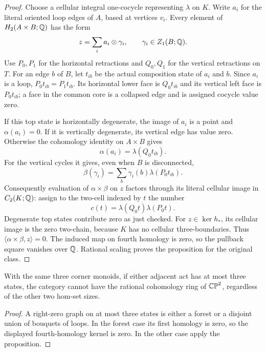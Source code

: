 \begin{proof}
Choose a cellular integral one-cocycle representing
$\lambda$ on $K$.  Write $a_i$ for the literal oriented
loop edges of $A$, based at vertices $v_i$.  Every element
of $H_2(A\times B;\mathbb Q)$ has the form
\[
 z=\sum_i a_i\otimes\gamma_i,
 \qquad \gamma_i\in Z_1(B;\mathbb Q).
\]
Use $P_0,P_1$ for the horizontal retractions and $Q_0,Q_1$
for the vertical retractions on $T$.  For an edge $b$ of
$B$, let $t_{ib}$ be the actual composition state of
$a_i$ and $b$.  Since $a_i$ is a loop,
$P_0t_{ib}=P_1t_{ib}$.  Its horizontal lower face is
$Q_0t_{ib}$ and its vertical left face is $P_0t_{ib}$;
a face in the common core is a collapsed edge and is
assigned cocycle value zero.

If this top state is horizontally degenerate, the image
of $a_i$ is a point and $\alpha(a_i)=0$.  If it is
vertically degenerate, its vertical edge has value zero.
Otherwise the cohomology identity on $A\times B$ gives
\[
 \alpha(a_i)=\lambda(Q_0t_{ib}).
\]
For the vertical cycles it gives, even when $B$ is
disconnected,
\[
 \beta(\gamma_i)
   =\sum_b\gamma_i(b)\lambda(P_0t_{ib}).
\]
Consequently evaluation of $\alpha\times\beta$ on $z$
factors through its literal cellular image in $C_2(K;\mathbb Q)$:
assign to the two-cell indexed by $t$ the number
\[
 c(t)=\lambda(Q_0t)\lambda(P_0t).
\]
Degenerate top states contribute zero as just checked.
For $z\in\ker h_*$, its cellular image is the zero
two-chain, because $K$ has no cellular three-boundaries.
Thus $\langle\alpha\times\beta,z\rangle=0$.
The induced map on fourth homology is zero, so the
pullback square vanishes over $\mathbb Q$.  Rational scaling
proves the proposition for the original class.
\end{proof}

\begin{corollary}\label{C:three-state-adjacent-chart-square}
With the same three corner monoids, if either adjacent
act has at most three states, the category cannot have
the rational cohomology ring of $\mathbb {CP}^2$, regardless of
the other two hom-set sizes.
\end{corollary}
\begin{proof}
A right-zero graph on at most three states is either
a forest or a disjoint union of bouquets of loops.
In the forest case its first homology is zero, so the
displayed fourth-homology kernel is zero.  In the other
case apply the proposition.
\end{proof}
